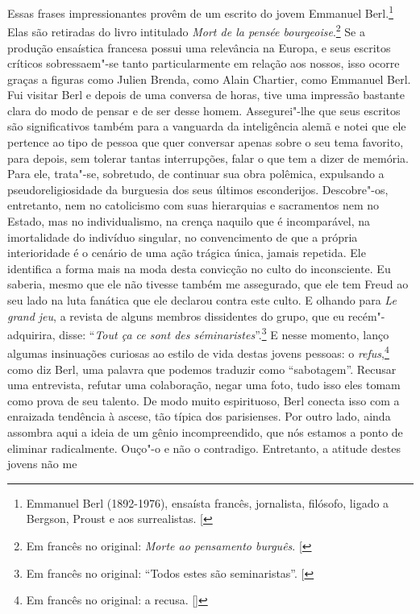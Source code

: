 Essas frases impressionantes provêm de um escrito do jovem Emmanuel
Berl.\footnote{Emmanuel Berl (1892-1976), ensaísta francês,
  jornalista, filósofo, ligado a Bergson, Proust e aos surrealistas. {[}\versal{N.~E.}{]}}
Elas são retiradas do livro intitulado \emph{Mort de la pensée %
bourgeoise}.\footnote{Em francês no original: \emph{Morte ao pensamento burguês}. {[}\versal{N.~T.}{]}} Se a  produção ensaística francesa possui uma relevância na Europa, e seus escritos críticos sobressaem"-se tanto
particularmente em relação aos nossos, isso ocorre graças a figuras
como Julien Brenda, como Alain Chartier, como Emmanuel Berl. Fui visitar
Berl e depois de uma conversa de horas, tive uma impressão bastante
clara do modo de pensar e de ser desse homem. Assegurei"-lhe que seus
escritos são significativos também para a vanguarda da inteligência
alemã e notei que ele pertence ao tipo de pessoa que quer conversar apenas sobre o seu tema favorito, para depois, sem tolerar tantas interrupções, falar o que tem a dizer de memória. Para ele, trata"-se, sobretudo, de
continuar sua obra polêmica, expulsando a pseudoreligiosidade da
burguesia dos seus últimos esconderijos. Descobre"-os, entretanto, nem no
catolicismo com suas hierarquias e sacramentos nem no Estado, mas no
individualismo, na crença naquilo que é incomparável, na imortalidade do
indivíduo singular, no convencimento de que a própria interioridade é o
cenário de uma ação trágica única, jamais repetida. Ele identifica a forma
mais na moda desta convicção no culto do inconsciente. Eu saberia, mesmo que ele não tivesse também me assegurado, que ele tem Freud ao seu lado na luta fanática que ele declarou contra este culto. E olhando
para \emph{Le grand jeu}, a revista de alguns membros dissidentes do
grupo, que eu recém"-adquirira, disse: ``\emph{Tout ça ce sont des
séminaristes}''.\footnote{Em francês no original: ``Todos estes são
  seminaristas''. {[}\versal{N. T.}{]}} E  nesse momento, lanço algumas insinuações curiosas ao estilo de
vida destas jovens pessoas: o \emph{refus},\footnote{Em francês no original: a recusa. []} como diz Berl, uma palavra que podemos traduzir como ``sabotagem''.
Recusar uma entrevista, refutar uma colaboração, negar uma foto, tudo
isso eles tomam como prova de seu talento. De modo muito espirituoso,
Berl conecta isso com a enraizada tendência à ascese, tão típica dos
parisienses. Por outro lado, ainda assombra aqui a ideia de um gênio incompreendido,
que nós estamos a ponto de eliminar radicalmente.
Ouço"-o e não o contradigo. Entretanto, a atitude destes jovens não me
